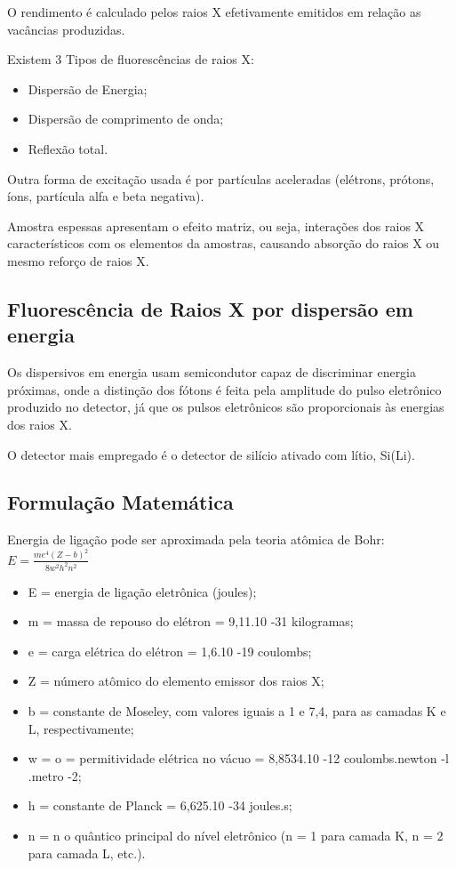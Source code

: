 

O rendimento é calculado pelos raios X efetivamente emitidos em relação as 
vacâncias produzidas.

Existem 3 Tipos de fluorescências de raios X:
\begin{itemize}
  \item Dispersão de Energia;
  \item Dispersão de comprimento de onda;
  \item Reflexão total.
\end{itemize}


Outra forma de excitação usada é por partículas aceleradas 
(elétrons, prótons, íons, partícula alfa e beta negativa).

Amostra espessas apresentam o efeito matriz, ou seja, interações dos 
raios X característicos com os elementos da amostras, causando 
absorção do raios X ou mesmo reforço de raios X.


\subsection{Fluorescência de Raios X por dispersão em energia}

Os dispersivos em energia usam semicondutor capaz de discriminar energia 
próximas, onde a distinção dos fótons é feita pela amplitude do pulso 
eletrônico produzido no detector, já que os pulsos eletrônicos são
proporcionais às energias dos raios X. 

O detector mais empregado é o detector de silício ativado com lítio, Si(Li).

\subsection{Formulação Matemática}

Energia de ligação pode ser aproximada pela teoria atômica de Bohr:
\begin{math}
E = \frac{me^4(Z-b)^2}{8w^2h^2n^2}
\end{math}

\begin{itemize}
  \item E = energia de ligação eletrônica (joules);
  \item m = massa de repouso do elétron = 9,11.10 -31 kilogramas;
  \item e = carga elétrica do elétron = 1,6.10 -19 coulombs;
  \item Z = número atômico do elemento emissor dos raios X;
  \item b = constante de Moseley, com valores iguais a 1 e 7,4, 
        para as camadas K e L, respectivamente;
  \item w = o = permitividade elétrica no vácuo = 8,8534.10 -12 
        coulombs.newton -l .metro -2;
  \item h = constante de Planck = 6,625.10 -34 joules.s;
  \item n = n o quântico principal do nível eletrônico 
        (n = 1 para camada K, n = 2 para camada L, etc.).
\end{itemize}

